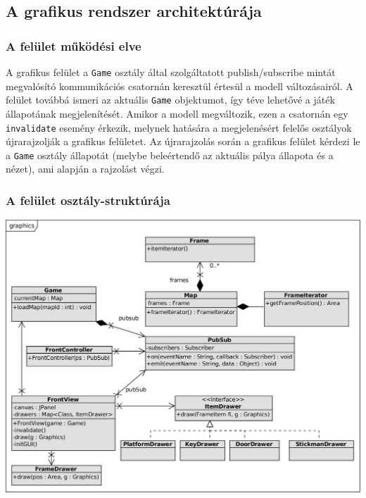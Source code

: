 		\subsection{A grafikus rendszer architektúrája}
		
		\subsubsection{A felület működési elve}
		A grafikus felület a \texttt{Game} osztály által szolgáltatott publish/subscribe mintát megvalósító kommunikációs csatornán keresztül értesül a modell változásairól. A felület továbbá ismeri az aktuális \texttt{Game} objektumot, így téve lehetővé a játék állapotának megjelenítését. Amikor a modell megváltozik, ezen a csatornán egy \texttt{invalidate} esemény érkezik, melynek hatására a megjelenésért felelős osztályok újrarajzolják a grafikus felületet. Az újrarajzolás során a grafikus felület kérdezi le a \texttt{Game} osztály állapotát (melybe beleértendő az aktuális pálya állapota és a nézet), ami alapján a rajzolást végzi.
		
		\subsubsection{A felület osztály-struktúrája}
			
	    \begin{center}
		    \includegraphics[scale=0.88]{resources/graphics.png}
	    \end{center}

